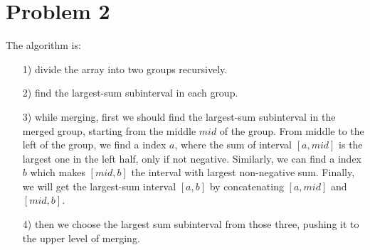 \documentclass[letter,12pt]{article}
\begin{document}
\section*{Problem 2}
The algorithm is:
\begin{itemize}
    \item[1)] divide the array into two groups recursively.
    \item[2)] find the largest-sum subinterval in each group.
    \item[3)] while merging, first we should find the largest-sum 
    subinterval in the merged group, starting from the middle $mid$ of the 
    group. From middle to the left of the group, we find a index $a$, where 
    the sum of interval $[a, mid]$ is the largest one in the left half, only if 
    not negative. Similarly, we can find a index $b$ which makes $[mid, b]$
    the interval with largest non-negative sum. Finally, we will get the 
    largest-sum interval $[a,b]$ by concatenating $[a, mid]$ and $[mid, b]$.
    \item[4)] then we choose the largest sum subinterval from those three, 
    pushing it to the upper level of merging.
\end{itemize}
\end{document}
